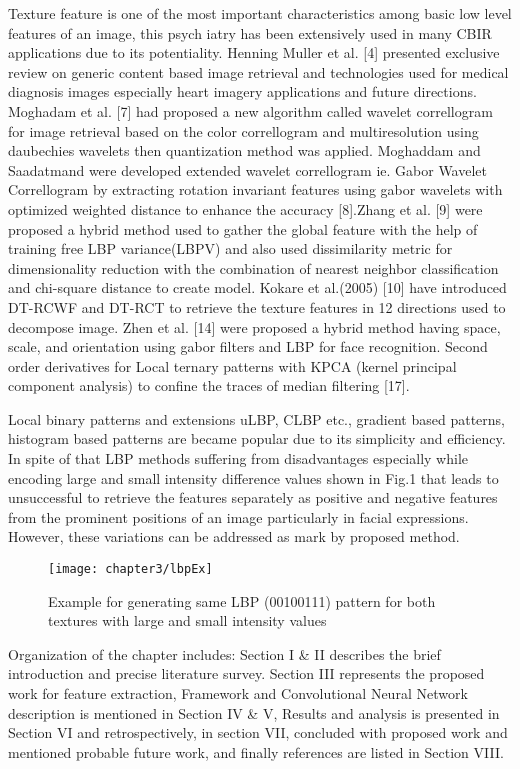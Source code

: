 Texture feature is one of the most important characteristics among basic low level features of an image, this psych	iatry has been extensively used in many CBIR applications due to its potentiality. Henning Muller et al. [4] presented exclusive review on generic content based image retrieval and technologies used for medical diagnosis images especially heart imagery applications and future directions. Moghadam et al. [7] had proposed a new algorithm called wavelet correllogram for image retrieval based on the color correllogram and multiresolution using daubechies wavelets then quantization method was applied. Moghaddam and Saadatmand were developed extended wavelet correllogram ie. Gabor Wavelet Correllogram by extracting  rotation invariant features using gabor wavelets with optimized weighted distance to enhance the accuracy [8].Zhang et al. [9] were proposed a hybrid method used to gather the global feature with the help of training free LBP variance(LBPV) and also used dissimilarity metric for dimensionality reduction with the combination of nearest neighbor classification and chi-square distance to create model. Kokare et al.(2005) [10] have introduced DT-RCWF and DT-RCT to retrieve the texture features in 12 directions used to decompose image. Zhen et al. [14] were proposed a hybrid method having space, scale, and orientation using gabor filters and LBP for face recognition. Second order derivatives for Local ternary patterns with KPCA (kernel principal component analysis) to confine the traces of median filtering [17].


Local binary patterns and extensions uLBP, CLBP etc., gradient based patterns, histogram based patterns are became popular due to its simplicity and efficiency. In spite of that LBP methods suffering from disadvantages especially while encoding large and small intensity difference values shown in Fig.1 that leads to unsuccessful to retrieve the features separately as positive and negative features from the prominent positions of an image particularly in facial expressions. However, these variations can be addressed as mark by proposed method.
\begin{figure}
	\centering
	\texttt{[image: chapter3/lbpEx]}
	\caption{Example for generating same LBP (00100111) pattern for both textures with large and small intensity values}
	\label{fig:lbpex}
\end{figure}


Organization of the chapter includes: Section I \& II describes the brief introduction and precise literature survey. Section III represents the proposed work for feature extraction, Framework and Convolutional Neural Network description is mentioned in Section IV \& V, Results and analysis is presented in Section VI and retrospectively, in section VII, concluded with proposed work and mentioned probable future work,  and finally references are listed in Section VIII.


